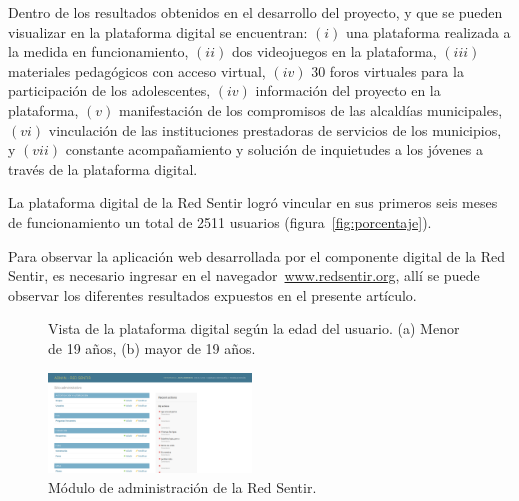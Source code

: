 \documentclass[journal,transmag]{IEEEtran}
\begin{document}
Dentro de los resultados obtenidos en el desarrollo del proyecto, y que se pueden visualizar en la plataforma digital se encuentran: $(i)$ una plataforma realizada a la medida en funcionamiento, $(ii)$ dos videojuegos en la plataforma, $(iii)$ materiales pedagógicos con acceso virtual, $(iv)$ $30$ foros virtuales para la participación de los adolescentes, $(iv)$ información del proyecto en la plataforma, $(v)$ manifestación de los compromisos de las alcaldías municipales, $(vi)$ vinculación de las instituciones prestadoras de servicios de los municipios, y $(vii)$ constante acompañamiento y solución de inquietudes a los jóvenes a través de la plataforma digital.

La plataforma digital de la Red Sentir logró vincular en sus primeros seis meses de funcionamiento un total de 2511 usuarios (figura~\ref{fig:porcentaje}).

Para observar la aplicación web desarrollada por el componente digital de la Red Sentir, es necesario ingresar en el navegador~\url{www.redsentir.org}, allí se puede observar los diferentes resultados expuestos en el presente artículo.

\begin{figure}[tbp]
  \centering
	  \hspace{1mm}
  \caption{Vista de la plataforma digital según la edad del usuario. (a) Menor de 19 años, (b) mayor de 19 años.}
  \label{fig:vista_plataforma}
\end{figure}

\begin{figure}[tbp]
\centering
\includegraphics[width=0.48\textwidth]{admin.png}
\caption{Módulo de administración de la Red Sentir.}
\label{fig:admin}
\end{figure}
\end{document}
